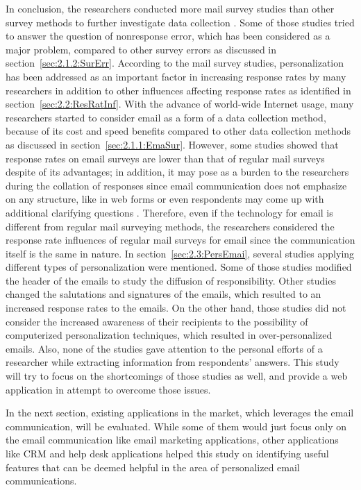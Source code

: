 In conclusion, the researchers conducted more mail survey studies than other survey methods to further investigate data collection \citep{Dillman1991}. Some of those studies tried to answer the question of nonresponse error, which has been considered as a major problem, compared to other survey errors as discussed in section~\ref{sec:2.1.2:SurErr}. According to the mail survey studies, personalization has been addressed as an important factor in increasing response rates by many researchers in addition to other influences affecting response rates as identified in section~\ref{sec:2.2:ResRatInf}. With the advance of world-wide Internet usage, many researchers started to consider email as a form of a data collection method, because of its cost and speed benefits compared to other data collection methods as discussed in section~\ref{sec:2.1.1:EmaSur}. However, some studies showed that response rates on email surveys are lower than that of regular mail surveys despite of its advantages; in addition, it may pose as a burden to the researchers during the collation of responses since email communication does not emphasize on any structure, like in web forms or even respondents may come up with additional clarifying questions \citep{Selm2006}. Therefore, even if the technology for email is different from regular mail surveying methods, the researchers considered the response rate influences of regular mail surveys for email since the communication itself is the same in nature. In section~\ref{sec:2.3:PersEmai}, several studies applying different types of personalization were mentioned. Some of those studies modified the header of the emails to study the diffusion of responsibility. Other studies changed the salutations and signatures of the emails, which resulted to an increased response rates to the emails. On the other hand, those studies did not consider the increased awareness of their recipients to the possibility of computerized personalization techniques, which resulted in over-personalized emails. Also, none of the studies gave attention to the personal efforts of a researcher while extracting information from respondents' answers. This study will try to focus on the shortcomings of those studies as well, and provide a web application in attempt to overcome those issues.
\vspace{1cm}

In the next section, existing applications in the market, which leverages the email communication, will be evaluated. While some of them would just focus only on the email communication like email marketing applications, other applications like \ac{CRM} and help desk applications helped this study on identifying useful features that can be deemed helpful in the area of personalized email communications.

